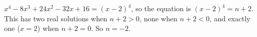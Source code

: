 $x^4-8x^3+24x^2-32x+16=(x-2)^4$, so the equation is $(x-2)^4=n+2$. This has two real solutions when $n+2>0$, none when $n+2<0$, and exactly one ($x=2$) when $n+2=0$. So $n=\boxed{-2}$.
